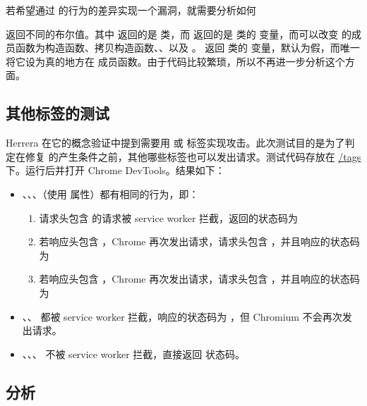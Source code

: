 若希望通过  的行为的差异实现一个漏洞，就需要分析如何

\noindent{} 返回不同的布尔值。其中  返回的是  类，而  返回的是  类的  变量，而可以改变  的成员函数为构造函数、拷贝构造函数、、以及 。 返回  类的  变量，默认为假，而唯一将它设为真的地方在  成员函数。由于代码比较繁琐，所以不再进一步分析这个方面。

\subsection{其他标签的测试}

Herrera 在它的概念验证中提到需要用  或  标签实现攻击。此次测试目的是为了判定在修复  的产生条件之前，其他哪些标签也可以发出请求。测试代码存放在 \href{https://github.com/georgetian3/xsleaks/tree/main/src/tags}{/tags} 下。运行后并打开 Chrome DevTools。结果如下：

\begin{itemize}
    \item {}、、、（使用  属性）都有相同的行为，即：
    \begin{enumerate}
        \item 请求头包含  的请求被 service worker 拦截，返回的状态码为 
        \item 若响应头包含 ，Chrome 再次发出请求，请求头包含 ，并且响应的状态码为 
        \item 若响应头包含 ，Chrome 再次发出请求，请求头包含 ，并且响应的状态码为 
    \end{enumerate}
    \item {}、、 都被 service worker 拦截，响应的状态码为 ，但 Chromium 不会再次发出请求。
    \item {}、、、 不被 service worker 拦截，直接返回  状态码。
\end{itemize}

\subsection{分析}

